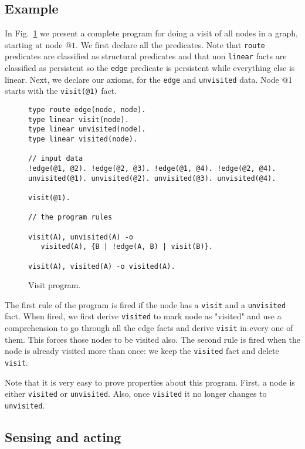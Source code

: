 \subsection{Example}

In Fig.~\ref{code:visit} we present a complete \lang program for doing a visit of all nodes
in a graph, starting at node $@1$. We first declare all the predicates. Note that \texttt{route} predicates are classified as structural predicates and that non \texttt{linear} facts are classified as persistent so the \texttt{edge} predicate is persistent while everything else is linear. Next, we declare our axioms, for the \texttt{edge} and \texttt{unvisited} data.
Node $@1$ starts with the \texttt{visit(@1)} fact.

\begin{figure}[h!]
\small\begin{verbatim}
type route edge(node, node).
type linear visit(node).
type linear unvisited(node).
type linear visited(node).

// input data
!edge(@1, @2). !edge(@2, @3). !edge(@1, @4). !edge(@2, @4).
unvisited(@1). unvisited(@2). unvisited(@3). unvisited(@4).

visit(@1).

// the program rules

visit(A), unvisited(A) -o
   visited(A), {B | !edge(A, B) | visit(B)}.

visit(A), visited(A) -o visited(A).
\end{verbatim}
  \caption{Visit program.}
  \label{code:visit}
\end{figure}
\normalsize

The first rule of the program is fired if the node has a \texttt{visit} and a \texttt{unvisited} fact. When fired, we first derive \texttt{visited} to mark node as "visited" and use a
comprehension to go through all the edge facts and derive \texttt{visit} in every one of them.
This forces those nodes to be visited also. The second rule is fired when the node is already
visited more than once: we keep the \texttt{visited} fact and delete \texttt{visit}.

Note that it is very easy to prove properties about this program. First, a node is either
\texttt{visited} or \texttt{unvisited}. Also, once \texttt{visited} it no longer changes to
\texttt{unvisited}.

\subsection{Sensing and acting}

